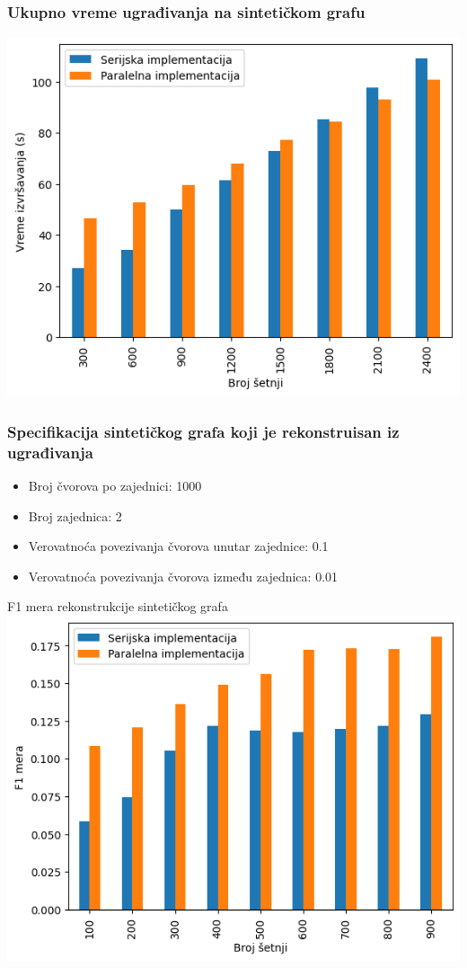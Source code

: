 \documentclass{beamer}
\begin{document}
\begin{frame}
    \frametitle{Ukupno vreme ugrađivanja na sintetičkom grafu}
    \centering
    \includegraphics[height=0.8\textheight]{csv/4.13.png}
\end{frame}

\begin{frame}
    \frametitle{Specifikacija sintetičkog grafa koji je rekonstruisan iz ugrađivanja}
    \begin{itemize}
        \item Broj čvorova po zajednici: 1000
        \item Broj zajednica: 2
        \item Verovatnoća povezivanja čvorova unutar zajednice: 0.1
        \item Verovatnoća povezivanja čvorova između zajednica: 0.01
    \end{itemize}
\end{frame}

\begin{frame}{F1 mera rekonstrukcije sintetičkog grafa}
    \centering
    \includegraphics[height=0.8\textheight]{./csv/4.10.png}
\end{frame}
    
\end{document}
